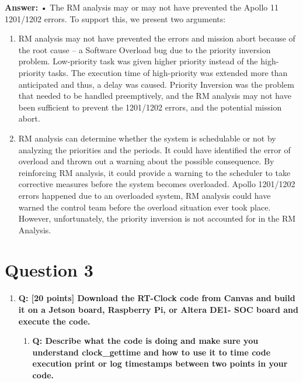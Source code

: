 \documentclass[a4paper,11pt]{article}%
\newenvironment{qanda}{\setlength{\parindent}{0pt}}{\bigskip}
\newcommand{\Q}{\bigskip\bfseries Q: }
\newcommand{\A}{\par\textbf{Answer: } \normalfont}
\begin{document}
\begin{qanda}
\begin{enumerate}
\begin{enumerate}
				      \A     • The RM analysis may or may not have prevented the Apollo 11 1201/1202 errors. To support this, we present two arguments:
					  \begin{enumerate}
						\item RM analysis may not have prevented the errors and mission abort because of the root cause – a Software Overload bug due to the priority inversion problem. Low-priority task was given higher priority instead of the high-priority tasks. The execution time of high-priority was extended more than anticipated and thus, a delay was caused.
						Priority Inversion was the problem that needed to be handled preemptively, and the RM analysis may not have been sufficient to prevent the 1201/1202 errors, and the potential mission abort.
						\item RM analysis can determine whether the system is schedulable or not by analyzing the priorities and the periods. It could have identified the error of overload and thrown out a warning about the possible consequence. By reinforcing RM analysis, it could provide a warning to the scheduler to take corrective measures before the system becomes overloaded. Apollo 1201/1202 errors happened due to an overloaded system, RM analysis could have warned the control team before the overload situation ever took place. However, unfortunately, the priority inversion is not accounted for in the RM Analysis.
					  \end{enumerate} 

			\end{enumerate}


	\end{enumerate}


	

	\section{Question 3}
	\begin{enumerate}
		\item[] \Q  [20 points] Download the RT-Clock code from Canvas and build it on a Jetson board, Raspberry Pi, or Altera DE1- SOC board and execute the code.
    	 
			\begin{enumerate}
				\item \Q Describe what the code is doing and make sure you understand clock\_gettime and how to use it to time code execution print or log timestamps between two points in your code.


\end{enumerate}
\end{enumerate}
\end{qanda}
\end{document}
